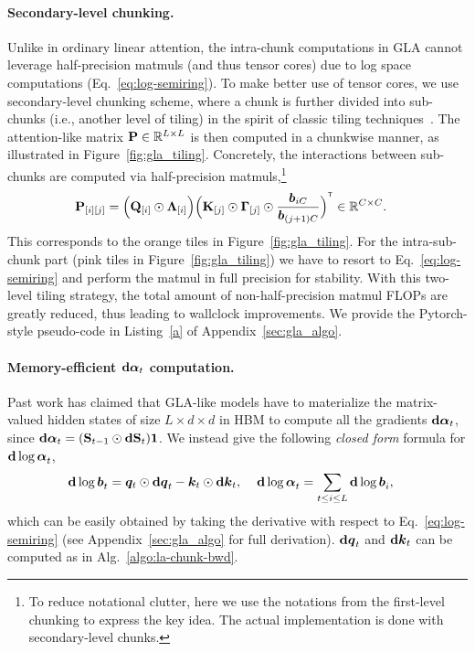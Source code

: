 \paragraph{Secondary-level chunking.}
Unlike in ordinary linear attention, the intra-chunk computations in GLA {cannot} leverage half-precision matmuls (and thus tensor cores) due to log space computations (Eq.~\ref{eq:log-semiring}). To make better use of tensor cores, we use secondary-level chunking scheme, where a chunk is further divided into sub-chunks (i.e., another level of tiling) in the spirit of classic tiling techniques~\cite{flashattention1}. The  attention-like matrix ${\mathbf{P}} \in \mathbb{R}^{L\times L}$ is then computed in a chunkwise manner, as illustrated in Figure~\ref{fig:gla_tiling}. 
 Concretely, the interactions  between sub-chunks are computed via half-precision matmuls,\footnote{To reduce notational clutter, here we use the notations from the first-level chunking to express the key idea. The actual implementation is done with secondary-level chunks.}
\begin{align*}
 \rmP_{[i][j]} &=  \Big(\rmQ_{[i]} \odot \bLambda_{[i]} \Big) \Big(\rmK_{[j]} \odot \bGamma_{[j]} \odot  
 \frac{\vb_{iC}}{\vb_{(j+1)C}} \Big)^{\intercal} \in \mathbb{R}^{C\times C}.
 \label{eq:gla-subchunk-compute-p}
\end{align*}
This corresponds to the orange tiles in Figure~\ref{fig:gla_tiling}. For the intra-sub-chunk part (pink tiles in Figure~\ref{fig:gla_tiling}) we have to resort to Eq.~\ref{eq:log-semiring} and perform the matmul in full precision for stability.
With this two-level tiling strategy, the total amount of non-half-precision matmul FLOPs are greatly reduced, thus leading to wallclock improvements. We provide the Pytorch-style pseudo-code in Listing~\ref{a} of Appendix~\ref{sec:gla_algo}.

\vspace{-2mm}
\paragraph{Memory-efficient  \textnormal{${\mathbf{d}\bm{\alpha}}_t$} computation.} 
Past work \citep[\S 3.1]{mao-2022-fine} has claimed that GLA-like models have to materialize the matrix-valued hidden states of size $L \times d \times d$ in HBM to compute all the gradients ${\mathbf{d}\bm{\alpha}}_t$, since ${\mathbf{d}\bm{\alpha}}_t =  ({\mathbf{S}}_{t-1} \odot \mathbf d{\mathbf{S}}_{t}) \mathbf{1}$. 
%
We instead give the following \emph{closed form} formula for ${\mathbf{d}\log\bm{\alpha}}_t$, 
\begin{align*}
    {\mathbf{d}\log\bm{b}}_t &= {\bm{q}}_t \odot {\mathbf{d}\bm{q}}_t - {\bm{k}}_t \odot {\mathbf{d}\bm{k}}_t,  \hspace{4mm}
   {\mathbf{d}\log\bm{\alpha}}_t  = \sum_{t \leq i \leq L} {\mathbf{d}\log\bm{b}}_i,
\end{align*}
which can be easily obtained by taking the derivative with respect to 
 Eq.~\ref{eq:log-semiring} (see Appendix~\ref{sec:gla_algo} for full derivation). ${\mathbf{d}\bm{q}}_t$ and ${\mathbf{d}\bm{k}}_t$ can be  computed  as in Alg.~\ref{algo:la-chunk-bwd}.
 
